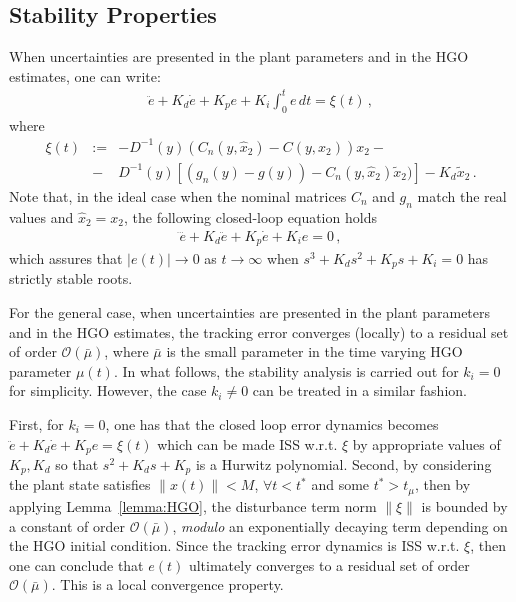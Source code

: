 \documentclass[letterpaper, 10 pt, conference]{ieeeconf}  %
\theoremstyle{plain}
\theoremstyle{definition}
\theoremstyle{remark}
\begin{document}
\subsection{Stability Properties}

When uncertainties are presented in the plant parameters and in the HGO estimates, one can write:
%
%
\begin{align}
\ddot{e} + K_d \dot{e} + K_p e + K_i\int_{0}^{t}e \, dt = \xi(t)\,,
\label{eq:closed}
\end{align}
%
where 
%
\begin{eqnarray}
\xi(t)&:=&-D^{-1}(y) (C_n(y,\hat{x}_2)-C(y,x_2)) x_2 -  \\  \nonumber
& -& D^{-1}(y)\left[(g_n(y)-g(y))-C_n(y,\hat{x}_2) \tilde{x}_2)\right]-K_d \tilde{x}_2\,.
\end{eqnarray}
%
Note that, in the ideal case when the nominal matrices $C_n$ and $g_n$ match the real values and $\hat{x}_2=x_2$, the following closed-loop equation holds
%
\begin{align}
\dddot{e} + K_d \ddot{e} + K_p \dot{e} + K_i e =0\,,
\label{eq:closed}
\end{align}
%
which assures that $|e(t)| \rightarrow 0$ as $t \rightarrow \infty$ when  $s^3 + K_d s^2 + K_p s + K_i = 0$ has strictly stable roots. 



For the general case, when uncertainties are presented in the plant parameters and in the HGO estimates, the tracking error converges (locally) to a residual set of order $\mathcal{O}(\bar{\mu})$, where $\bar{\mu}$ is the small parameter in the time varying HGO parameter $\mu(t)$. In what follows, the stability analysis is carried out for $k_i=0$ for simplicity. However, the case $k_i \neq 0$ can be treated in a similar fashion. 

First, for $k_i=0$, one has that the closed loop error dynamics becomes 
%
$\ddot{e} + K_d \dot{e} + K_p e  = \xi(t)$
%
which can be made ISS w.r.t. $\xi$ by appropriate values of $K_p,K_d$ so that $s^2 + K_d s + K_p$ is a Hurwitz polynomial. Second, by considering the plant state satisfies $\|x(t)\| < M$, $\forall t<t^*$ and some $t^*>t_\mu$, then by applying Lemma~\ref{lemma:HGO}, the disturbance term norm $\| \xi \|$ is bounded by a constant of order $\mathcal{O}(\bar{\mu})$, {\em modulo} an exponentially decaying term depending on the HGO initial condition. Since the tracking error dynamics is ISS w.r.t. $\xi$, then one can conclude that $e(t)$ ultimately converges to a residual set of order $\mathcal{O}(\bar{\mu})$. This is a local convergence property. 
\end{document}
